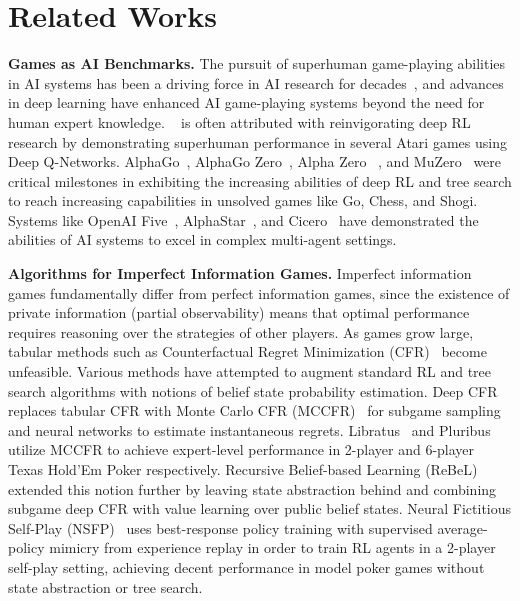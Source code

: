 \section{Related Works}
\textbf{Games as AI Benchmarks.} The pursuit of superhuman game-playing abilities in AI systems has been a driving force in AI research for decades~\citep{samuel1959some, tesauro1995temporal, campbell2002deep}, and advances in deep learning have enhanced AI game-playing systems beyond the need for human expert knowledge. ~\citet{mnih2015human} is often attributed with reinvigorating deep RL research by demonstrating superhuman performance in several Atari games using Deep Q-Networks. AlphaGo~\citep{silver2016mastering}, AlphaGo Zero~\citep{silver2017mastering}, Alpha Zero ~\citep{silver2017zero}, and MuZero~\citep{schrittwieser2020mastering} were critical milestones in exhibiting the increasing abilities of deep RL and tree search to reach increasing capabilities in unsolved games like Go, Chess, and Shogi. Systems like OpenAI Five~\citep{berner2019dota}, AlphaStar~\citep{vinyals2019grandmaster}, and Cicero~\citep{meta2022human} have demonstrated the abilities of AI systems to excel in complex multi-agent settings.

\textbf{Algorithms for Imperfect Information Games.} Imperfect information games fundamentally differ from perfect information games, since the existence of private information (partial observability) means that optimal performance requires reasoning over the strategies of other players. As games grow large, tabular methods such as Counterfactual Regret Minimization (CFR)~\citep{zinkevich2007regret} become unfeasible. Various methods have attempted to augment standard RL and tree search algorithms with notions of belief state probability estimation. Deep CFR~\citep{brown2019deep} replaces tabular CFR with Monte Carlo CFR (MCCFR)~\citep{burch2012efficient} for subgame sampling and neural networks to estimate instantaneous regrets. Libratus~\citep{brown2017libratus} and Pluribus~\citep{brown2019superhuman} utilize MCCFR to achieve expert-level performance in 2-player and 6-player Texas Hold'Em Poker respectively. Recursive Belief-based Learning (ReBeL)~\citep{brown2020combining} extended this notion further by leaving state abstraction behind and combining subgame deep CFR with value learning over public belief states. Neural Fictitious Self-Play (NSFP)~\citep{heinrich2016deep} uses best-response policy training with supervised average-policy mimicry from experience replay in order to train RL agents in a 2-player self-play setting, achieving decent performance in model poker games without state abstraction or tree search.

